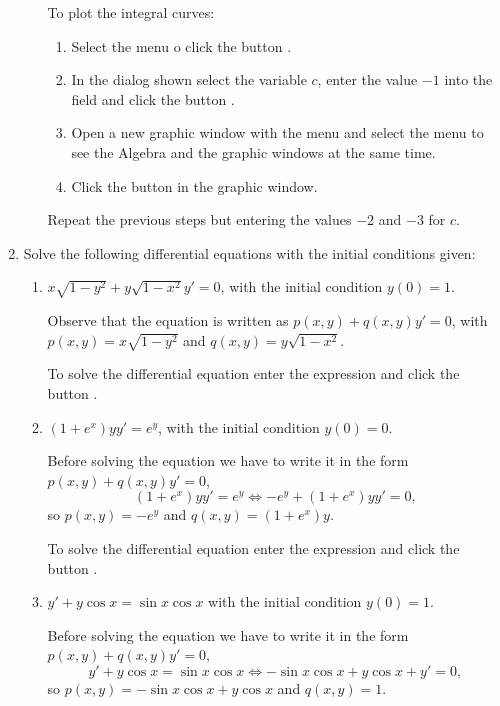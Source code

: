 \begin{enumerate}[leftmargin=*]
\begin{enumerate}
\begin{indication}
To plot the integral curves:
\begin{enumerate}[resume]
\item Select the menu  o click the button .
\item In the dialog shown select the variable $c$, enter the value $-1$ into the field  and click the
button .
\item Open a new graphic window with the menu  and select the menu  to see the Algebra and the graphic windows at the same time.
\item Click the button  in the graphic window.
\end{enumerate}
Repeat the previous steps but entering the values $-2$ and $-3$ for $c$.
\end{indication}
\end{enumerate}


\item Solve the following differential equations with the initial conditions given:
\begin{enumerate}
\item $x\sqrt{1-y^2}+y\sqrt{1-x^2} y'=0$, with the initial condition $y(0)=1$.
\begin{indication}
Observe that the equation is written as $p(x,y)+q(x,y)y'=0$, with $p(x,y)=x\sqrt{1-y^2}$ and $q(x,y)=y\sqrt{1-x^2}$.

To solve the differential equation enter the expression  and click the button .
\end{indication}


\item $(1+e^x)yy'=e^y$, with the initial condition $y(0)=0$.
\begin{indication}
Before solving the equation we have to write it in the form $p(x,y)+q(x,y)y'=0$,
\[
(1+e^x)yy'=e^y \Leftrightarrow -e^y+(1+e^x)yy'=0,
\]
so $p(x,y)=-e^y$ and $q(x,y)=(1+e^x)y$.

To solve the differential equation enter the expression  and click the button .
\end{indication}


\item $y'+y\cos x=\sin x\cos x$ with the initial condition $y(0)=1$.
\begin{indication}
Before solving the equation we have to write it in the form $p(x,y)+q(x,y)y'=0$,
\[
y'+y\cos x=\sin x\cos x \Leftrightarrow -\sin x\cos x+y\cos x+y'=0,
\]
so $p(x,y)=-\sin x\cos x+y\cos x$ and $q(x,y)=1$.


\end{indication}
\end{enumerate}
\end{enumerate}
